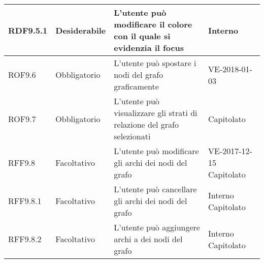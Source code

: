\documentclass[../AnalisideiRequisiti.tex]{subfiles}
\begin{document}
\begin{longtable}{| p{2cm} | p{2.5cm} |p{5cm} | p{2.5cm} |}
		\newline RDF9.5.1&\newline Desiderabile&
		\newline L'utente può modificare il colore con il quale si evidenzia il focus&
		\newline Interno
		\\[1em]
		\hline
		
		\newline ROF9.6&\newline Obbligatorio&
		\newline L'utente può spostare i nodi del grafo graficamente&
		\newline {}{UC13.2} \newline VE-2018-01-03
		\\[1em]
		\hline
		
		\newline ROF9.7&\newline Obbligatorio&
		\newline L'utente può visualizzare gli strati di relazione del grafo selezionati&
		\newline {}{UC13.5} \newline Capitolato
		\\[1em]
		\hline
	
		\newline RFF9.8&\newline Facoltativo&
		\newline L'utente può modificare gli archi dei nodi del grafo&
		\newline  VE-2017-12-15 \newline Capitolato
		\\[1em]
		\hline
		
		\newline RFF9.8.1&\newline Facoltativo&
		\newline L'utente può cancellare gli archi dei nodi del grafo&
		\newline Interno \newline Capitolato
		\\[1em]
		\hline
		
		\newline RFF9.8.2&\newline Facoltativo&
		\newline L'utente può aggiungere archi a dei nodi del grafo&
		\newline Interno \newline Capitolato
		\\[1em]
		\hline
		

\end{longtable}
\end{document}
